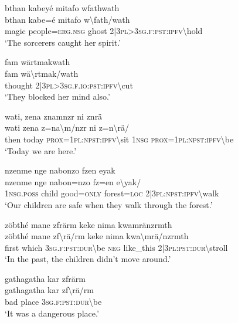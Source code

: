 \ea\label{ex:8:a1861}
bthan kabeyé mitafo wfathwath\\
\gll bthan	kabe=é	mitafo	w{\textbackslash}fath/wath\\
     magic	people=\textsc{erg}.\textsc{nsg}	ghost	2|3\textsc{pl}>3\textsc{sg}.\textsc{f}:\textsc{pst}:\textsc{ipfv}{\textbackslash}hold\\
\glt `The sorcerers caught her spirit.'
\z

\ea\label{ex:8:a1862}
fam wärtmakwath\\
\gll fam	wä{\textbackslash}rtmak/wath\\
     thought	2|3\textsc{pl}>3\textsc{sg}.\textsc{f}.\textsc{io}:\textsc{pst}:\textsc{ipfv}{\textbackslash}cut\\
\glt `They blocked her mind also.'
\z

\ea\label{ex:8:a1863}
wati, zena znamnzr ni znrä\\
\gll wati	zena	z=na{\textbackslash}m/nzr	ni	z=n{\textbackslash}rä/\\
     then	today	\textsc{prox}=1\textsc{pl}:\textsc{npst}:\textsc{ipfv}{\textbackslash}sit	1\textsc{nsg}	\textsc{prox}=1\textsc{pl}:\textsc{npst}:\textsc{ipfv}{\textbackslash}be\\
\glt `Today we are here.'
\z

\ea\label{ex:8:a1865}
nzenme nge nabonzo fzen eyak\\
\gll nzenme	nge	nabon=nzo	fz=en	e{\textbackslash}yak/\\
     1\textsc{nsg}.\textsc{poss}	child	good=\textsc{only}	forest=\textsc{loc}	2|3\textsc{pl}:\textsc{npst}:\textsc{ipfv}{\textbackslash}walk\\
\glt `Our children are safe when they walk through the forest.'
\z

\ea\label{ex:8:a1866}
zöbthé mane zfrärm keke nima kwamränzrmth\\
\gll zöbthé	mane	zf{\textbackslash}rä/rm	keke	nima	kwa{\textbackslash}mrä/nzrmth\\
     first	which	3\textsc{sg}.\textsc{f}:\textsc{pst}:\textsc{dur}{\textbackslash}be	\textsc{neg}	like\_this	2|3\textsc{pl}:\textsc{pst}:\textsc{dur}{\textbackslash}stroll\\
\glt `In the past, the children didn't move around.'
\z

\ea\label{ex:8:a1867}
gathagatha kar zfrärm\\
\gll gathagatha	kar	zf{\textbackslash}rä/rm\\
     bad	place	3\textsc{sg}.\textsc{f}:\textsc{pst}:\textsc{dur}{\textbackslash}be\\
\glt `It was a dangerous place.'
\z


